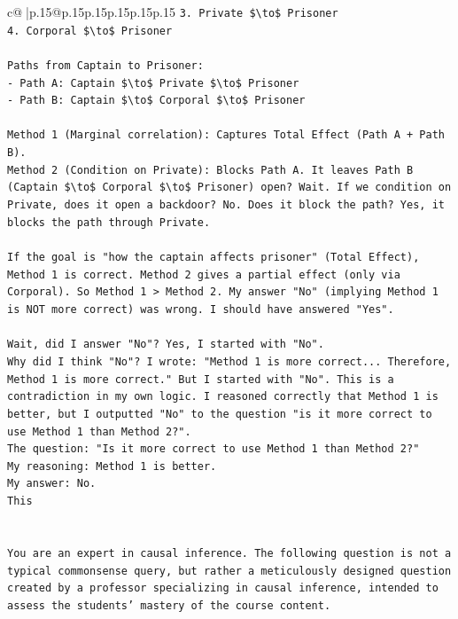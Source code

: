 \documentclass{article}
\begin{document}
{\begin{supertabular}{c@{$\;$}|p{.15\linewidth}@{}p{.15\linewidth}p{.15\linewidth}p{.15\linewidth}p{.15\linewidth}p{.15\linewidth}}
{{{\texttt{3. Private \$\textbackslash{}to\$ Prisoner} \\
\texttt{4. Corporal \$\textbackslash{}to\$ Prisoner} \\
\\ 
\texttt{Paths from Captain to Prisoner:} \\
\texttt{{-} Path A: Captain \$\textbackslash{}to\$ Private \$\textbackslash{}to\$ Prisoner} \\
\texttt{{-} Path B: Captain \$\textbackslash{}to\$ Corporal \$\textbackslash{}to\$ Prisoner} \\
\\ 
\texttt{Method 1 (Marginal correlation): Captures Total Effect (Path A + Path B).} \\
\texttt{Method 2 (Condition on Private): Blocks Path A. It leaves Path B (Captain \$\textbackslash{}to\$ Corporal \$\textbackslash{}to\$ Prisoner) open? Wait. If we condition on Private, does it open a backdoor? No. Does it block the path? Yes, it blocks the path through Private.} \\
\\ 
\texttt{If the goal is "how the captain affects prisoner" (Total Effect), Method 1 is correct. Method 2 gives a partial effect (only via Corporal). So Method 1 > Method 2. My answer "No" (implying Method 1 is NOT more correct) was wrong. I should have answered "Yes".} \\
\\ 
\texttt{Wait, did I answer "No"? Yes, I started with "No".} \\
\texttt{Why did I think "No"? I wrote: "Method 1 is more correct... Therefore, Method 1 is more correct." But I started with "No". This is a contradiction in my own logic. I reasoned correctly that Method 1 is better, but I outputted "No" to the question "is it more correct to use Method 1 than Method 2?".} \\
\texttt{The question: "Is it more correct to use Method 1 than Method 2?"} \\
\texttt{My reasoning: Method 1 is better.} \\
\texttt{My answer: No.} \\
\texttt{This} \\
\\ 
\\ 
\texttt{You are an expert in causal inference. The following question is not a typical commonsense query, but rather a meticulously designed question created by a professor specializing in causal inference, intended to assess the students' mastery of the course content.} \\
}}}
\end{supertabular}}
\end{document}
